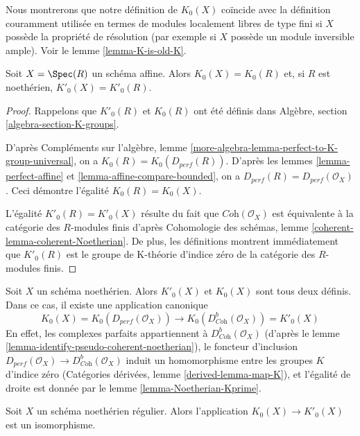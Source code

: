\noindent
Nous montrerons que notre définition de $K_0(X)$ coïncide avec la définition
couramment utilisée en termes de modules localement libres de type fini si $X$
possède la propriété de résolution (par exemple si $X$ possède un module
inversible ample). Voir le lemme \ref{lemma-K-is-old-K}.

\begin{lemma}
\label{lemma-K-agrees-affine}
Soit $X = \Spec(R)$ un schéma affine. Alors $K_0(X) = K_0(R)$
et, si $R$ est noethérien, $K'_0(X) = K'_0(R)$.
\end{lemma}

\begin{proof}
Rappelons que $K'_0(R)$ et $K_0(R)$ ont été définis dans
Algèbre, section \ref{algebra-section-K-groups}.

\medskip\noindent
D'après Compléments sur l'algèbre, lemme \ref{more-algebra-lemma-perfect-to-K-group-universal},
on a $K_0(R) = K_0(D_{perf}(R))$.
D'après les lemmes \ref{lemma-perfect-affine} et \ref{lemma-affine-compare-bounded},
on a $D_{perf}(R) = D_{perf}(\mathcal{O}_X)$.
Ceci démontre l'égalité $K_0(R) = K_0(X)$.

\medskip\noindent
L'égalité $K'_0(R) = K'_0(X)$ résulte du fait que
$\textit{Coh}(\mathcal{O}_X)$ est équivalente à la catégorie
des $R$-modules finis d'après Cohomologie des schémas, lemme
\ref{coherent-lemma-coherent-Noetherian}. De plus, les définitions
montrent immédiatement que $K'_0(R)$ est le groupe de K-théorie d'indice zéro de la catégorie
des $R$-modules finis.
\end{proof}

\noindent
Soit $X$ un schéma noethérien. Alors $K'_0(X)$ et $K_0(X)$
sont tous deux définis. Dans ce cas, il existe une application canonique
$$
K_0(X) = K_0(D_{perf}(\mathcal{O}_X))
\longrightarrow
K_0(D^b_{\textit{Coh}}(\mathcal{O}_X)) = K'_0(X)
$$
En effet, les complexes parfaits appartiennent à $D^b_{\textit{Coh}}(\mathcal{O}_X)$
(d'après le lemme \ref{lemma-identify-pseudo-coherent-noetherian}), le foncteur
d'inclusion
$D_{perf}(\mathcal{O}_X) \to D^b_{\textit{Coh}}(\mathcal{O}_X)$
induit un homomorphisme entre les groupes $K$ d'indice zéro
(Catégories dérivées, lemme \ref{derived-lemma-map-K}),
et l'égalité de droite est donnée par le
lemme \ref{lemma-Noetherian-Kprime}.

\begin{lemma}
\label{lemma-Kprime-K}
Soit $X$ un schéma noethérien régulier. Alors
l'application $K_0(X) \to K'_0(X)$ est un isomorphisme.
\end{lemma}

